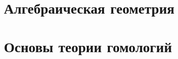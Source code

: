 \documentclass[dvipsnames, 11pt]{article}
\begin{document}
    
    
    
    
    
    
    
    
    
    
    
    
    
    

    \section{Алгебраическая геометрия}
    
       
        
    
    \newpage

    \section{Основы теории гомологий}
\end{document}
